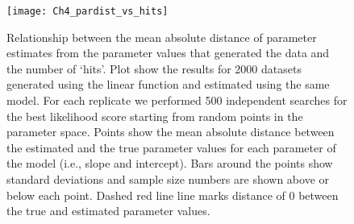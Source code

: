 \begin{figure}[hp]
	\centering
	\texttt{[image: Ch4\_pardist\_vs\_hits]}
	\caption[Relationship between the mean absolute distance of parameter estimates from the parameter values that generated the data and the number of `hits' after 500 independent searches.]{Relationship between the mean absolute distance of parameter estimates from the parameter values that generated the data and the number of `hits'. Plot show the results for 2000 datasets generated using the linear function and estimated using the same model. For each replicate we performed 500 independent searches for the best likelihood score starting from random points in the parameter space. Points show the mean absolute distance between the estimated and the true parameter values for each parameter of the model (i.e., slope and intercept). Bars around the points show standard deviations and sample size numbers are shown above or below each point. Dashed red line line marks distance of 0 between the true and estimated parameter values.}
	\label{fig:pardist}
\end{figure}